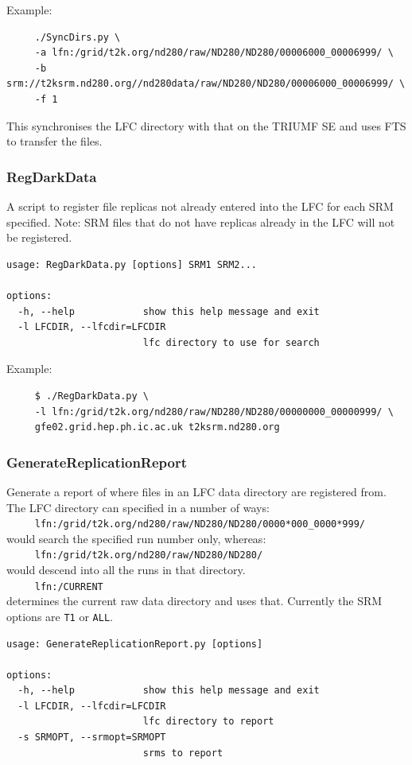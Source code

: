 \documentclass[11pt]{article}
\begin{document}
Example:
\begin{verbatim}
     ./SyncDirs.py \
     -a lfn:/grid/t2k.org/nd280/raw/ND280/ND280/00006000_00006999/ \
     -b srm://t2ksrm.nd280.org//nd280data/raw/ND280/ND280/00006000_00006999/ \
     -f 1
\end{verbatim}
This synchronises the LFC directory with that on the TRIUMF SE and uses FTS to
transfer the files.

\subsubsection*{RegDarkData}
A script to register file replicas not already entered into the
LFC for each SRM specified. Note: SRM files that do not have replicas
already in the LFC will not be registered.

\begin{verbatim}
usage: RegDarkData.py [options] SRM1 SRM2...

options:
  -h, --help            show this help message and exit
  -l LFCDIR, --lfcdir=LFCDIR
                        lfc directory to use for search
\end{verbatim}

Example:
\begin{verbatim}
     $ ./RegDarkData.py \
     -l lfn:/grid/t2k.org/nd280/raw/ND280/ND280/00000000_00000999/ \
     gfe02.grid.hep.ph.ic.ac.uk t2ksrm.nd280.org
\end{verbatim}

\subsubsection*{GenerateReplicationReport}
Generate a report of where files in an LFC data directory are registered from.
The LFC directory can specified in a number of ways:\\
\verb+     lfn:/grid/t2k.org/nd280/raw/ND280/ND280/0000*000_0000*999/+\\
would search the specified run number only, whereas:\\
\verb+     lfn:/grid/t2k.org/nd280/raw/ND280/ND280/+\\
would descend into all the runs in that directory.\\
\verb+     lfn:/CURRENT+\\
determines the current raw data directory and uses that. Currently the
SRM options are \verb+T1+ or \verb+ALL+.

\begin{verbatim}
usage: GenerateReplicationReport.py [options]

options:
  -h, --help            show this help message and exit
  -l LFCDIR, --lfcdir=LFCDIR
                        lfc directory to report
  -s SRMOPT, --srmopt=SRMOPT
                        srms to report

\end{verbatim}
\end{document}
